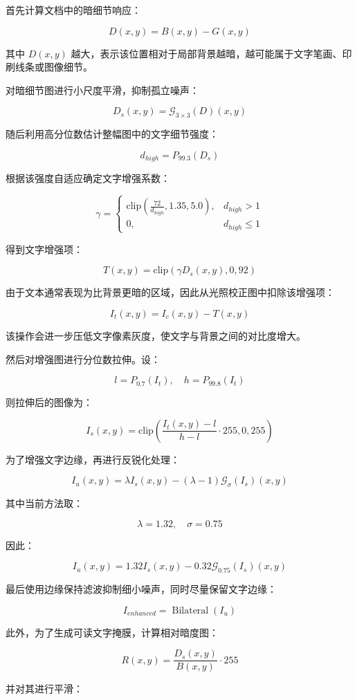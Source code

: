 \documentclass[letterpaper]{article}
\begin{document}
首先计算文档中的暗细节响应：

\[
D(x,y)=B(x,y)-G(x,y)
\]

其中 \(D(x,y)\) 越大，表示该位置相对于局部背景越暗，越可能属于文字笔画、印刷线条或图像细节。

对暗细节图进行小尺度平滑，抑制孤立噪声：

\[
D_s(x,y)=\mathcal{G}_{3\times3}(D)(x,y)
\]

随后利用高分位数估计整幅图中的文字细节强度：

\[
d_{high}=P_{99.3}(D_s)
\]

根据该强度自适应确定文字增强系数：

\[
\gamma=
\begin{cases}
\mathrm{clip}\left(\frac{72}{d_{high}},1.35,5.0\right), & d_{high}>1 \\
0, & d_{high}\leq 1
\end{cases}
\]

得到文字增强项：

\[
T(x,y)=\mathrm{clip}(\gamma D_s(x,y),0,92)
\]

由于文本通常表现为比背景更暗的区域，因此从光照校正图中扣除该增强项：

\[
I_t(x,y)=I_c(x,y)-T(x,y)
\]

该操作会进一步压低文字像素灰度，使文字与背景之间的对比度增大。

然后对增强图进行分位数拉伸。设：

\[
l=P_{0.7}(I_t),\quad h=P_{99.8}(I_t)
\]

则拉伸后的图像为：

\[
I_s(x,y)=
\mathrm{clip}
\left(
\frac{I_t(x,y)-l}{h-l}\cdot255,
0,255
\right)
\]

为了增强文字边缘，再进行反锐化处理：

\[
I_{u}(x,y)=
\lambda I_s(x,y)
-
(\lambda-1)\mathcal{G}_{\sigma}(I_s)(x,y)
\]

其中当前方法取：

\[
\lambda=1.32,\quad \sigma=0.75
\]

因此：

\[
I_u(x,y)=1.32I_s(x,y)-0.32\mathcal{G}_{0.75}(I_s)(x,y)
\]

最后使用边缘保持滤波抑制细小噪声，同时尽量保留文字边缘：

\[
I_{enhanced}=\operatorname{Bilateral}(I_u)
\]

此外，为了生成可读文字掩膜，计算相对暗度图：

\[
R(x,y)=
\frac{D_s(x,y)}{B(x,y)}\cdot255
\]

并对其进行平滑：
\end{document}
